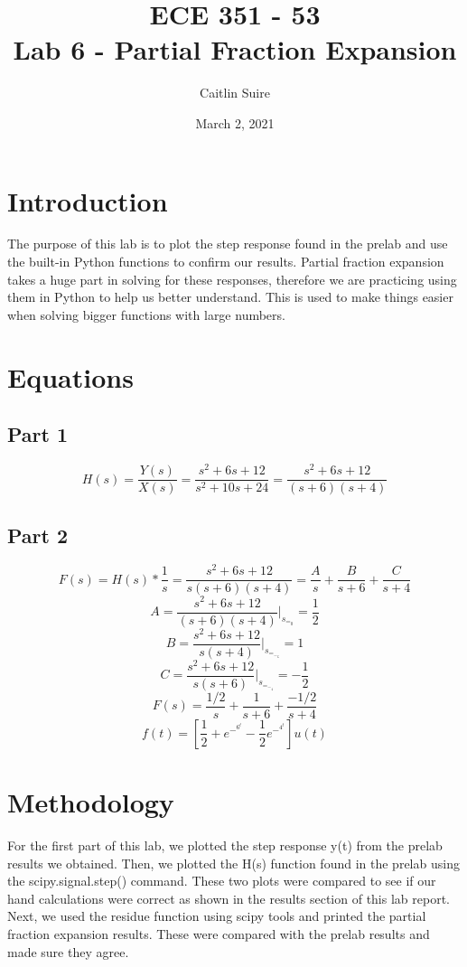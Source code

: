 \documentclass[12pt]{report}
\title{\myfont \textbf{ ECE 351 - 53 \\ \bigskip Lab 6 - Partial Fraction Expansion}}
\author{Caitlin Suire}
\date{March 2, 2021}
\begin{document}
\maketitle

\thispagestyle{empty}

\newpage

\tableofcontents
\pagebreak


\section{Introduction}
The purpose of this lab is to plot the step response found in the prelab and use the built-in Python functions to confirm our results. Partial fraction expansion takes a huge part in solving for these responses, therefore we are practicing using them in Python to help us better understand. This is used to make things easier when solving bigger functions with large numbers. 

\section{Equations}
\subsection{Part 1}
\[H(s) = \frac{Y(s)}{X(s)} = \frac{s^2+6s+12}{s^2+10s+24} = \frac{s^2+6s+12}{(s+6)(s+4)}\]

\subsection{Part 2}
\[F(s) = H(s) * \frac{1}{s} = \frac{s^2+6s+12}{s(s+6)(s+4)} = \frac{A}{s} + \frac{B}{s+6} + \frac{C}{s+4} \]
\[A = \frac{s^2+6s+12}{(s+6)(s+4)} |_s_=_0 = \frac{1}{2}\]
\[B = \frac{s^2+6s+12}{s(s+4)} |_s_=_-_6 = 1\]
\[C = \frac{s^2+6s+12}{s(s+6)} |_s_=_-_4 = -\frac{1}{2}\]
\[F(s) = \frac{1/2}{s} + \frac{1}{s+6} + \frac{-1/2}{s+4}\]
\[f(t) = [\frac{1}{2} + e^-^6^t - \frac{1}{2}e^-^4^t] u(t) \] 

\section{Methodology}
For the first part of this lab, we plotted the step response y(t) from the prelab results we obtained. Then, we plotted the H(s) function found in the prelab using the scipy.signal.step() command. These two plots were compared to see if our hand calculations were correct as shown in the results section of this lab report. Next, we used the residue function using scipy tools and printed the partial fraction expansion results. These were compared with the prelab results and made sure they agree. \\
\end{document}
